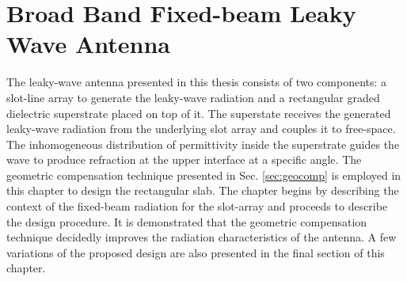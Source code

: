 \chapter{Broad Band Fixed-beam Leaky Wave Antenna} %
\label{Chapter3} 
\renewcommand{\sectionmark}[1]{\markright{\thesection.\ #1}}
\chead{\rightmark}

The leaky-wave antenna presented in this thesis consists of two components: a slot-line array to generate the leaky-wave radiation and a rectangular graded dielectric superstrate placed on top of it. The superstate receives the generated leaky-wave radiation from the underlying slot array and couples it to free-space. The inhomogeneous distribution of permittivity inside the superstrate guides the wave to produce refraction at the upper interface at a specific angle. The geometric compensation technique presented in Sec. \ref{sec:geocomp} is employed in this chapter to design the rectangular slab. The chapter begins by describing the context of the fixed-beam radiation for the slot-array and proceeds to describe the design procedure. It is demonstrated that the geometric compensation technique decidedly improves the radiation characteristics of the antenna. A few variations of the proposed design are also presented in the final section of this chapter. 
